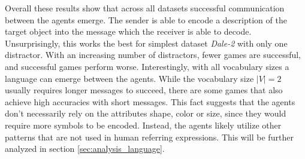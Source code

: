 Overall these results show that across all datasets successful communication between the agents emerge.
The sender is able to encode a description of the target object into the message which the receiver is able to decode.
Unsurprisingly, this works the best for simplest dataset \emph{Dale-2} with only one distractor.
With an increasing number of distractors, fewer games are successful, and successful games perform worse.
Interestingly, with all vocabulary sizes a language can emerge between the agents.
While the vocabulary size $|V|=2$ usually requires longer messages to succeed, there are some games that also achieve high accuracies with short messages.
This fact suggests that the agents don't necessarily rely on the attributes shape, color or size, since they would require more symbols to be encoded.
Instead, the agents likely utilize other patterns that are not used in human referring expressions.
This will be further analyzed in section \ref{sec:analysis_language}.